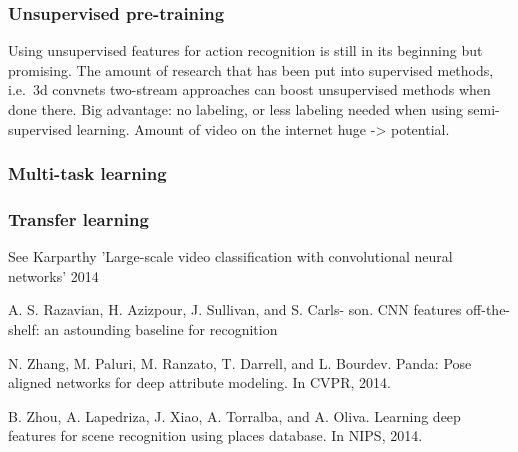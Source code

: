 \subsubsection{Unsupervised pre-training}
Using unsupervised features for action recognition is still in its beginning but promising.
The amount of research that has been put into supervised methods, i.e.\ 3d convnets two-stream approaches can boost unsupervised methods when done there.
Big advantage: no labeling, or less labeling needed when using semi-supervised learning.
Amount of video on the internet huge -> potential.


\subsubsection{Multi-task learning}

\subsubsection{Transfer learning}

See Karparthy 'Large-scale video classification with convolutional neural networks' 2014

A. S. Razavian, H. Azizpour, J. Sullivan, and S. Carls-
son. CNN features off-the-shelf: an astounding baseline for
recognition

N. Zhang, M. Paluri, M. Ranzato, T. Darrell, and L. Bourdev. Panda: Pose aligned networks for deep attribute modeling. In CVPR, 2014.

B. Zhou, A. Lapedriza, J. Xiao, A. Torralba, and A. Oliva. Learning deep features for scene recognition using places database. In NIPS, 2014.
